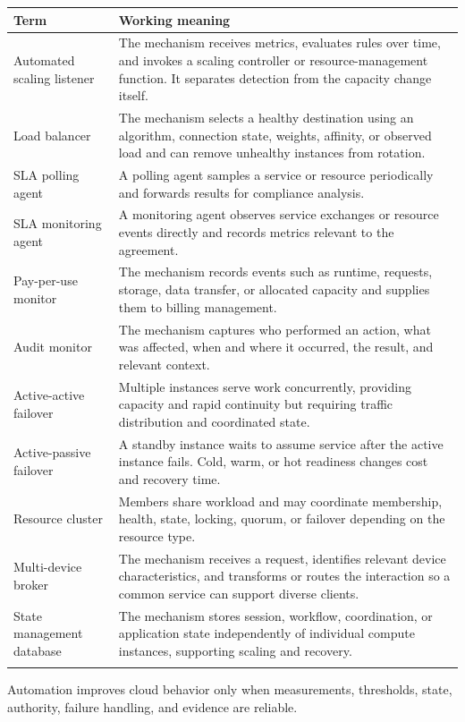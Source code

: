 \documentclass[11pt]{article}
\begin{document}
\begin{longtable}{@{}>{\RaggedRight\arraybackslash}p{}>{\RaggedRight\arraybackslash}p{}@{}}
\toprule\rowcolor{Navy}\color{white}\textbf{Term} & \color{white}\textbf{Working meaning}\\\midrule\endhead
Automated scaling listener & The mechanism receives metrics, evaluates rules over time, and invokes a scaling controller or resource-management function. It separates detection from the capacity change itself. \\\addlinespace[2pt]
Load balancer & The mechanism selects a healthy destination using an algorithm, connection state, weights, affinity, or observed load and can remove unhealthy instances from rotation. \\\addlinespace[2pt]
SLA polling agent & A polling agent samples a service or resource periodically and forwards results for compliance analysis. \\\addlinespace[2pt]
SLA monitoring agent & A monitoring agent observes service exchanges or resource events directly and records metrics relevant to the agreement. \\\addlinespace[2pt]
Pay-per-use monitor & The mechanism records events such as runtime, requests, storage, data transfer, or allocated capacity and supplies them to billing management. \\\addlinespace[2pt]
Audit monitor & The mechanism captures who performed an action, what was affected, when and where it occurred, the result, and relevant context. \\\addlinespace[2pt]
Active-active failover & Multiple instances serve work concurrently, providing capacity and rapid continuity but requiring traffic distribution and coordinated state. \\\addlinespace[2pt]
Active-passive failover & A standby instance waits to assume service after the active instance fails. Cold, warm, or hot readiness changes cost and recovery time. \\\addlinespace[2pt]
Resource cluster & Members share workload and may coordinate membership, health, state, locking, quorum, or failover depending on the resource type. \\\addlinespace[2pt]
Multi-device broker & The mechanism receives a request, identifies relevant device characteristics, and transforms or routes the interaction so a common service can support diverse clients. \\\addlinespace[2pt]
State management database & The mechanism stores session, workflow, coordination, or application state independently of individual compute instances, supporting scaling and recovery. \\\addlinespace[2pt]
\bottomrule
\end{longtable}
\begin{takeawaybox}
Automation improves cloud behavior only when measurements, thresholds, state, authority, failure handling, and evidence are reliable.
\end{takeawaybox}
\end{document}
